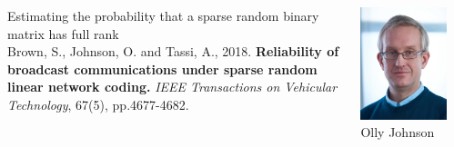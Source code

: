 \documentclass[aspectratio=169]{beamer}
\begin{document}
\begin{frame}
\begin{columns}
\begin{column}{0.45\textwidth}
{\LARGE Estimating the probability that a sparse random binary matrix has full rank}\\[10pt]
{\footnotesize Brown, S., Johnson, O. and Tassi, A., 2018. \textbf{Reliability of broadcast communications under sparse random linear network coding.} \textit{IEEE Transactions on Vehicular Technology}, 67(5), pp.4677-4682.}
\end{column}
\begin{column}{0.25\textwidth}
\centering
\includegraphics[width=\textwidth]{olly.jpg}\\
Olly Johnson
\end{column}
\begin{column}{0.25\textwidth}
\centering

\end{column}
\end{columns}
\end{frame}
\end{document}
